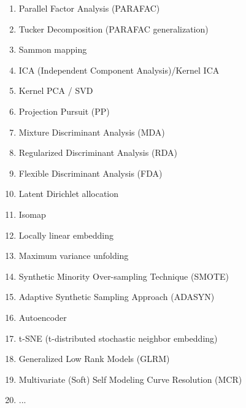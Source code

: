 \begin{itemize}
\begin{multicols}{2}
\begin{enumerate}
			\item Parallel Factor Analysis (PARAFAC)
			\item Tucker Decomposition (PARAFAC generalization)
			\item Sammon mapping
			\item ICA (Independent Component Analysis)/Kernel ICA
			\item Kernel PCA / SVD
			\item Projection Pursuit (PP) 
			\item Mixture Discriminant Analysis (MDA)
			\item Regularized Discriminant Analysis (RDA)
			\item Flexible Discriminant Analysis (FDA)
			\item Latent Dirichlet allocation
			\item Isomap
			\item Locally linear embedding
			\item Maximum variance unfolding
			\item Synthetic Minority Over-sampling Technique (SMOTE)
			\item Adaptive Synthetic Sampling Approach (ADASYN)
			\item Autoencoder
			\item t-SNE (t-distributed stochastic neighbor embedding) 
			\item Generalized Low Rank Models (GLRM)
			\item Multivariate (Soft) Self Modeling Curve Resolution (MCR)
			\item ...
		\end{enumerate}
		\end{multicols}
		

\end{itemize}
